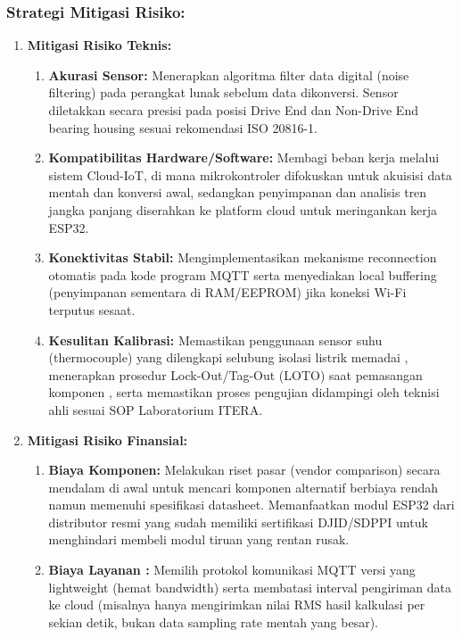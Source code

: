 \documentclass{elsinta}
\begin{document}
\subsubsection*{Strategi Mitigasi Risiko:}
\begin{enumerate}
    \item \textbf{Mitigasi Risiko Teknis:}
    \begin{enumerate}
        \item \textbf{Akurasi Sensor:} Menerapkan algoritma filter data digital (noise filtering) pada perangkat lunak sebelum data dikonversi. Sensor diletakkan secara presisi pada posisi Drive End dan Non-Drive End bearing housing sesuai rekomendasi ISO 20816-1.
        \item \textbf{Kompatibilitas Hardware/Software:} Membagi beban kerja melalui sistem Cloud-IoT, di mana mikrokontroler difokuskan untuk akuisisi data mentah dan konversi awal, sedangkan penyimpanan dan analisis tren jangka panjang diserahkan ke platform cloud untuk meringankan kerja ESP32. 
        \item \textbf{Konektivitas  Stabil:} Mengimplementasikan mekanisme reconnection otomatis pada kode program MQTT serta menyediakan local buffering (penyimpanan sementara di RAM/EEPROM) jika koneksi Wi-Fi terputus sesaat.
        \item \textbf{Kesulitan Kalibrasi:} Memastikan penggunaan sensor suhu (thermocouple) yang dilengkapi selubung isolasi listrik memadai , menerapkan prosedur Lock-Out/Tag-Out (LOTO) saat pemasangan komponen , serta memastikan proses pengujian didampingi oleh teknisi ahli sesuai SOP Laboratorium ITERA. 
    \end{enumerate}
    \item \textbf{Mitigasi Risiko Finansial:}
    \begin{enumerate}
        \item \textbf{Biaya Komponen:} Melakukan riset pasar (vendor comparison) secara mendalam di awal untuk mencari komponen alternatif berbiaya rendah namun memenuhi spesifikasi datasheet. Memanfaatkan modul ESP32 dari distributor resmi yang sudah memiliki sertifikasi DJID/SDPPI untuk menghindari membeli modul tiruan yang rentan rusak.
        \item \textbf{Biaya Layanan :} Memilih protokol komunikasi MQTT versi yang lightweight (hemat bandwidth) serta membatasi interval pengiriman data ke cloud (misalnya hanya mengirimkan nilai RMS hasil kalkulasi per sekian detik, bukan data sampling rate mentah yang besar). 

\end{enumerate}
\end{enumerate}
\end{document}
